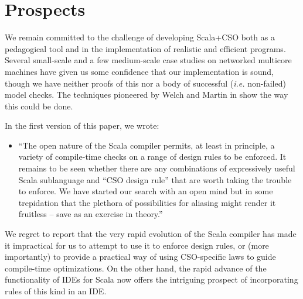 \documentclass[12pt]{IOS-Book-Article-CPA-2017}
\begin{document}



\section{Prospects}

We remain committed to the challenge of developing Scala+CSO both
as a pedagogical tool and in the implementation of realistic
and efficient programs.
%
Several small-scale and a few medium-scale case studies on
networked multicore machines have given us some confidence that
our implementation is sound, though we have neither proofs of
this nor a body of successful (\textit{i.e.} non-failed) 
model checks. The techniques pioneered by 
Welch and Martin in \cite{welchandmartin} show the way this could be done.

In the first version of this paper, we wrote:
\begin{itemize}\item[]
``The open nature of the Scala compiler permits, at least in principle,
a variety of compile-time checks on a range of design rules to be
enforced. It remains to be seen whether there are any combinations
of expressively useful Scala sublanguage and ``CSO design rule''
that are worth taking the trouble to enforce. We have started
our search with an open mind but in some trepidation that
the plethora of possibilities for aliasing might render
it fruitless -- save as an exercise in theory.''
\end{itemize}
We regret to report that the very rapid evolution of the Scala compiler has
made it impractical for us to attempt to use it to enforce design rules, or 
(more importantly) to provide a practical way of using CSO-specific laws to
guide compile-time optimizations. On the other hand, the rapid advance of 
the functionality of IDEs for Scala now offers the intriguing prospect 
of incorporating rules of this kind in an IDE. 
\end{document}

